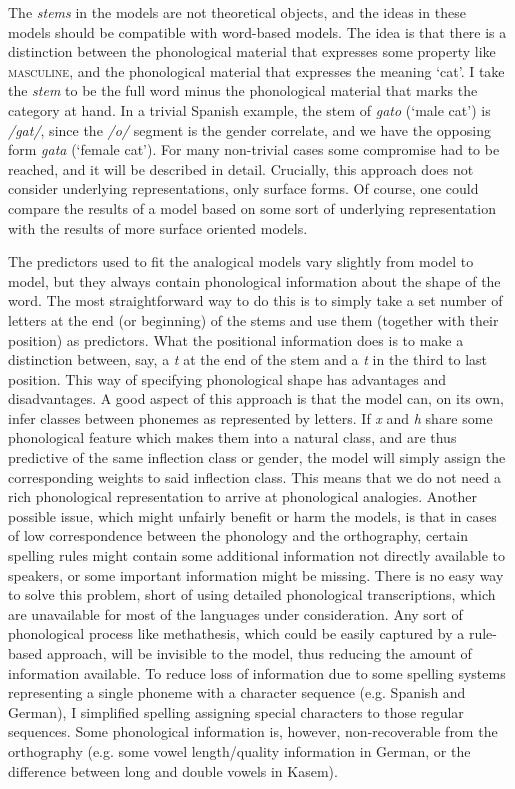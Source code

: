The \textit{stems} in the models are not theoretical objects, and the ideas in these models should be compatible with word-based models. The idea is that there is a distinction between the phonological material that expresses some property like \textsc{masculine}, and the phonological material that expresses the meaning `cat'. I take the \textit{stem} to be the full word minus the phonological material that marks the category at hand. In a trivial Spanish example, the stem of \textit{gato} (`male cat') is \textit{/gat/}, since the \textit{/o/} segment is the gender correlate, and we have the opposing form \textit{gata} (`female cat'). For many non-trivial cases some compromise had to be reached, and it will be described in detail. Crucially, this approach does not consider underlying representations, only surface forms. Of course, one could compare the results of a model based on some sort of underlying representation with the results of more surface oriented models.

The predictors used to fit the analogical models vary slightly from model to model, but they always contain phonological information about the shape of the word. The most straightforward way to do this is to simply take a set number of letters at the end (or beginning) of the stems and use them (together with their position) as predictors. What the positional information does is to make a distinction between, say, a \textit{t} at the end of the stem and a \textit{t} in the third to last position. This way of specifying phonological shape has advantages and disadvantages. A good aspect of this approach is that the model can, on its own, infer classes between phonemes as represented by letters. If \textit{x} and \textit{h} share some phonological feature which makes them into a natural class, and are thus predictive of the same inflection class or gender, the model will simply assign the corresponding weights to said inflection class. This means that we do not need a rich phonological representation to arrive at phonological analogies. Another possible issue, which might unfairly benefit or harm the models, is that in cases of low correspondence between the phonology and the orthography, certain spelling rules might contain some additional information not directly available to speakers, or some important information might be missing. There is no easy way to solve this problem, short of using detailed phonological transcriptions, which are unavailable for most of the languages under consideration. Any sort of phonological process like methathesis, which could be easily captured by a rule-based approach, will be invisible to the model, thus reducing the amount of information available. To reduce loss of information due to some spelling systems representing a single phoneme with a character sequence (e.g. Spanish and German), I simplified spelling assigning special characters to those regular sequences. Some phonological information is, however, non-recoverable from the orthography (e.g. some vowel length/quality information in German, or the difference between long and double vowels in Kasem).

